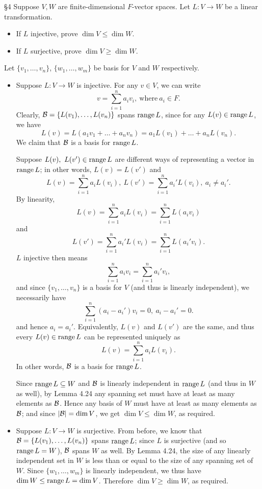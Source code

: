 \documentclass{homework}
\begin{document}
\begin{problem}{\S 4}
  Suppose $V,W$ are finite-dimensional $F$-vector spaces. Let $L:V\to W$ be a linear transformation.
  \begin{itemize}
    \item If $L$ injective, prove $\dim{V}\le \dim{W}$.
    \item If $L$ surjective, prove $\dim{V}\ge \dim{W}$.
  \end{itemize}
\end{problem}
\begin{solution}
  Let $\{ v_1,\ldots,v_n \}$, $\{ w_1,\ldots,w_m \}$ be basis for $V$ and $W$ respectively.
  \begin{itemize}
    \item Suppose $L:V\to W$ is injective. For any $v\in V$, we can write \[
        v = \sum_{i=1}^{n} a_iv_i, ~\text{where}~a_i\in F
      .\] Clearly, $\mathcal{B}=\{ L(v_1),\ldots,L(v_n) \}$ spans $\operatorname{range}{L}$, since for any $L(v)\in
      \operatorname{range}{L}$, we have \[
        L(v)=L(a_1v_1+\ldots+a_nv_n)=a_1L(v_1)+\ldots+a_nL(v_n)
      .\] We claim that $\mathcal{B}$ is a basis for $\operatorname{range}{L}$.

      Suppose $L(v),\ L(v')\in \operatorname{range}{L}$ are different ways of representing a vector in
      $\operatorname{range}{L}$; in other words, $L(v)=L(v')$ and \[
        L(v)=\sum_{i=1}^{n} a_iL(v_i),\ L(v')=\sum_{i=1}^{n} a_i'L(v_i),\ a_i\neq a_i'
      .\] By linearity, \[
        L(v)=\sum_{i=1}^{n} a_iL(v_i)=\sum_{i=1}^{n} L(a_iv_i)
      \] and \[
        L(v')=\sum_{i=1}^{n} a_i'L(v_i)=\sum_{i=1}^{n} L(a_i'v_i)
      .\]  $L$ injective then means \[
        \sum_{i=1}^{n} a_iv_i=\sum_{i=1}^{n} a_i'v_i
      ,\] and since $\{ v_1,\ldots,v_n \}$ is a basis for $V$ (and thus is linearly independent), we
      necessarily have \[
        \sum_{i=1}^{n} (a_i-a_i')v_i=0,\ a_i-a_i'=0
        .\] and hence $a_i=a_i'$. Equivalently, $L(v)$ and $L(v')$ are the same, and thus every
        $L(v)\in \operatorname{range}{L}$ can be represented uniquely as \[
        L(v)=\sum_{i=1}^{n} a_iL(v_i)
      .\] In other words, $\mathcal{B}$ is a basis for $\operatorname{range}{L}$.

      Since $\operatorname{range}{L}\subseteq W$ and $\mathcal{B}$ is linearly independent in $\operatorname{range}{L}$ (and thus in
      $W$ as well), by Lemma 4.24 any spanning set must have at least as many elements as $\mathcal{B}$.
      Hence any basis of $W$ must have at least as many elements as $\mathcal{B}$; and since $\left| \mathcal{B}
      \right| =\dim{V}$, we get $\dim{V}\le \dim{W}$, as required.

    \item Suppose $L:V\to W$ is surjective. From before, we know that $\mathcal{B}=\{
      L(v_1),\ldots,L(v_n)\}$ spans $\operatorname{range}{L}$; since $L$ is surjective (and so $\operatorname{range}{L}=W$),
      $\mathcal{B}$ spans $W$ as well. By Lemma 4.24, the size of any linearly independent set in $W$ is
      less than or equal to the size of any spanning set of $W$. Since $\{ w_1,\ldots,w_m \}$ is
      linearly independent, we thus have $\dim{W}\le \operatorname{range}{L}=\dim{V}$. Therefore $\dim{V}\ge
      \dim{W}$, as required.
  \end{itemize}
\end{solution}
\end{document}
